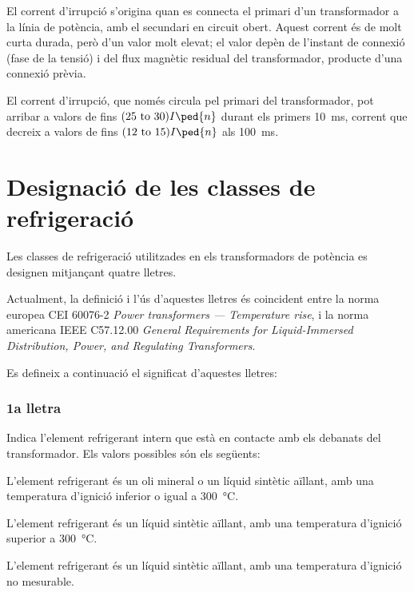 El corrent d'irrupció s'origina quan es  connecta el primari d'un transformador a la línia de potència, amb el secundari en circuit obert. Aquest corrent és de molt curta durada, però d'un valor molt elevat; el valor depèn de l'instant de connexió (fase de la tensió) i del flux magnètic residual del transformador, producte d'una connexió prèvia.

El corrent d'irrupció, que només circula pel primari del transformador, pot arribar a valors de fins $(\numrange{25}{30}) I\ped{n}$ durant els primers \qty{10}{ms}, corrent que decreix a valors de fins   $(\numrange{12}{15}) I\ped{n}$ als \qty{100}{ms}.

\section{Designació de les classes de refrigeració}\label{sec:trafos-pot-refrig}
 

Les classes de refrigeració utilitzades en els transformadors de
potència es designen mitjançant quatre lletres.

Actualment, la definició i l'ús d'aquestes lletres és coincident
entre la norma europea CEI 60076-2 \textit{Power transformers --- Temperature rise}, i la norma americana
IEEE C57.12.00  \textit{General Requirements for Liquid-Immersed Distribution, Power, and Regulating Transformers}.

Es defineix a continuació el significat d'aquestes lletres:

\subsubsection*{1a lletra}
Indica l'element refrigerant intern que està en
contacte amb els debanats del transformador. Els valors possibles
són els següents:

\begin{list}{}
   {\setlength{\labelwidth}{10mm} \setlength{\leftmargin}{10mm} \setlength{\labelsep}{2mm}}
   \item[\textbf{O}] L'element refrigerant és un oli mineral o un líquid sintètic aïllant, amb una temperatura d'ignició
   inferior o igual a \qty{300}{\degreeCelsius}.
   \item[\textbf{K}] L'element refrigerant és un líquid sintètic aïllant, amb una temperatura d'ignició
   superior a \qty{300}{\degreeCelsius}.
   \item[\textbf{L}] L'element refrigerant és un líquid sintètic aïllant, amb una temperatura d'ignició
   no mesurable.
\end{list}
  

